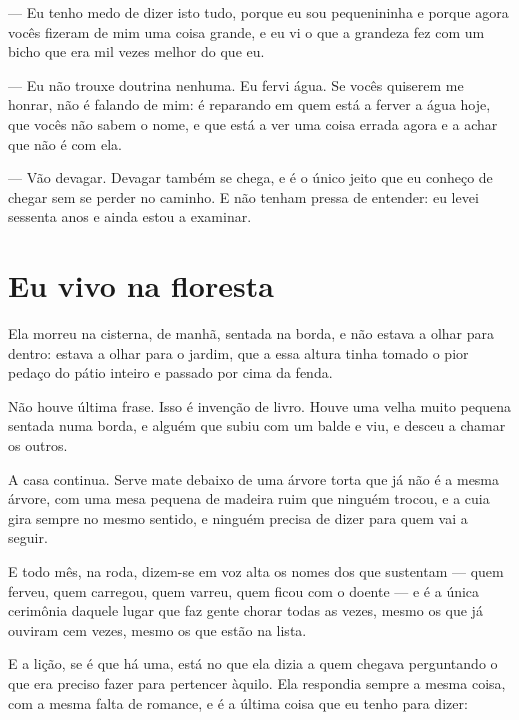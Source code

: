 \documentclass[livro.tex]{subfiles}
\begin{document}
--- Eu tenho medo de dizer isto tudo, porque eu sou pequenininha e porque agora vocês fizeram de
mim uma coisa grande, e eu vi o que a grandeza fez com um bicho que era mil vezes melhor do que
eu.

--- Eu não trouxe doutrina nenhuma. Eu fervi água. Se vocês quiserem me honrar, não é falando de
mim: é reparando em quem está a ferver a água hoje, que vocês não sabem o nome, e que está a ver
uma coisa errada agora e a achar que não é com ela.

--- Vão devagar. Devagar também se chega, e é o único jeito que eu conheço de chegar sem se
perder no caminho. E não tenham pressa de entender: eu levei sessenta anos e ainda estou a
examinar.

\chapter{Eu vivo na floresta}

Ela morreu na cisterna, de manhã, sentada na borda, e não estava a olhar para dentro: estava a
olhar para o jardim, que a essa altura tinha tomado o pior pedaço do pátio inteiro e passado por
cima da fenda.

Não houve última frase. Isso é invenção de livro. Houve uma velha muito pequena sentada numa
borda, e alguém que subiu com um balde e viu, e desceu a chamar os outros.

\medskip

A casa continua. Serve mate debaixo de uma árvore torta que já não é a mesma árvore, com uma mesa
pequena de madeira ruim que ninguém trocou, e a cuia gira sempre no mesmo sentido, e ninguém
precisa de dizer para quem vai a seguir.

E todo mês, na roda, dizem-se em voz alta os nomes dos que sustentam --- quem ferveu, quem
carregou, quem varreu, quem ficou com o doente --- e é a única cerimônia daquele lugar que faz
gente chorar todas as vezes, mesmo os que já ouviram cem vezes, mesmo os que estão na lista.

\medskip

E a lição, se é que há uma, está no que ela dizia a quem chegava perguntando o que era preciso
fazer para pertencer àquilo. Ela respondia sempre a mesma coisa, com a mesma falta de romance, e
é a última coisa que eu tenho para dizer:

\medskip
\end{document}
